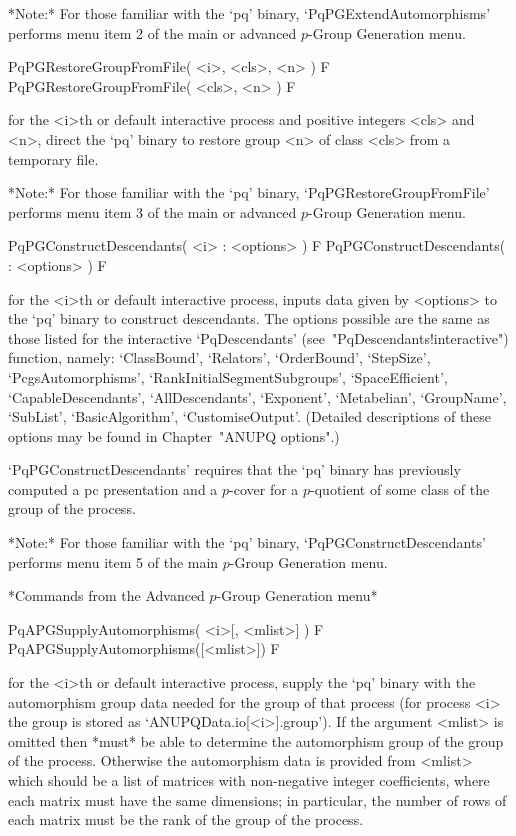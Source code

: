 *Note:*    
For  those  familiar  with  the  `pq'  binary,  `PqPGExtendAutomorphisms'
performs menu item 2 of the main or advanced $p$-Group Generation menu. 

\>PqPGRestoreGroupFromFile( <i>, <cls>, <n> ) F
\>PqPGRestoreGroupFromFile( <cls>, <n> ) F

for the <i>th  or  default  interactive  {\ANUPQ}  process  and  positive
integers <cls> and <n>, direct the `pq' binary to restore  group  <n>  of
class <cls> from a temporary file.

*Note:* 
For those  familiar  with  the  `pq'  binary,  `PqPGRestoreGroupFromFile'
performs menu item 3 of the main or advanced $p$-Group Generation menu.

\>PqPGConstructDescendants( <i> : <options> ) F
\>PqPGConstructDescendants( : <options> ) F

for the <i>th or default interactive {\ANUPQ} process, inputs data  given
by <options> to the `pq' binary to  construct  descendants.  The  options
possible are the same as those listed for the interactive `PqDescendants'
(see~"PqDescendants!interactive")   function,    namely:    `ClassBound',
`Relators',      `OrderBound',      `StepSize',      `PcgsAutomorphisms',
`RankInitialSegmentSubgroups',  `SpaceEfficient',   `CapableDescendants',
`AllDescendants',  `Exponent',  `Metabelian',   `GroupName',   `SubList',
`BasicAlgorithm',  `CustomiseOutput'.  (Detailed  descriptions  of  these
options may be found in Chapter~"ANUPQ options".)

`PqPGConstructDescendants' requires that the `pq' binary  has  previously
computed a pc presentation and a $p$-cover for  a  $p$-quotient  of  some
class of the group of the process.

*Note:* 
For those  familiar  with  the  `pq'  binary,  `PqPGConstructDescendants'
performs menu item 5 of the main $p$-Group Generation menu.

*Commands from the Advanced $p$-Group Generation menu*

\>PqAPGSupplyAutomorphisms( <i>[, <mlist>] ) F
\>PqAPGSupplyAutomorphisms([<mlist>]) F

for the <i>th or default interactive {\ANUPQ} process,  supply  the  `pq'
binary with the automorphism group data needed  for  the  group  of  that
process    (for    process    <i>    the    group    is     stored     as
`ANUPQData.io[<i>].group'). If  the  argument  <mlist>  is  omitted  then
{\GAP} *must* be able to determine the automorphism group of the group of
the process. Otherwise the automorphism data  is  provided  from  <mlist>
which  should  be  a  list  of   matrices   with   non-negative   integer
coefficients, where  each  matrix  must  have  the  same  dimensions;  in
particular, the number of rows of each matrix must be  the  rank  of  the
group of the process.

